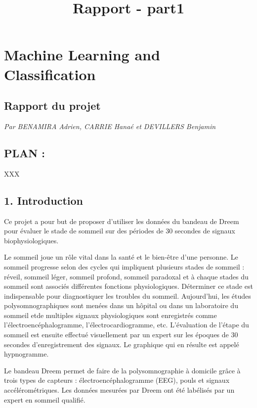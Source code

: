 \documentclass[11pt]{article}
\title{Rapport - part1}
\begin{document}
    
    
    \maketitle
    
    

    
    \section{Machine Learning and
Classification}\label{machine-learning-and-classification}

\subsection{Rapport du projet}\label{rapport-du-projet}

\emph{Par BENAMIRA Adrien, CARRIE Hanaé et DEVILLERS Benjamin}

\subsection{PLAN :}\label{plan}

XXX

    \subsection{1. Introduction}\label{introduction}

    Ce projet a pour but de proposer d'utiliser les données du bandeau de
Dreem pour évaluer le stade de sommeil sur des périodes de 30 secondes
de signaux biophysiologiques.

Le sommeil joue un rôle vital dans la santé et le bien-être d'une
personne. Le sommeil progresse selon des cycles qui impliquent plusieurs
stades de sommeil : réveil, sommeil léger, sommeil profond, sommeil
paradoxal et à chaque stades du sommeil sont associés différentes
fonctions physiologiques. Déterminer ce stade est indispensable pour
diagnostiquer les troubles du sommeil. Aujourd'hui, les études
polysomnographiques sont menées dans un hôpital ou dans un laboratoire
du sommeil etde multiples signaux physiologiques sont enregistrés comme
l'électroencéphalogramme, l'électrocardiogramme, etc. L'évaluation de
l'étape du sommeil est ensuite effectué visuellement par un expert sur
les époques de 30 secondes d'enregistrement des signaux. Le graphique
qui en résulte est appelé hypnogramme.

Le bandeau Dreem permet de faire de la polysomnographie à domicile grâce
à trois types de capteurs : électroencéphalogramme (EEG), pouls et
signaux accélérométriques. Les données mesurées par Dreem ont été
labélisés par un expert en sommeil qualifié.
\end{document}
